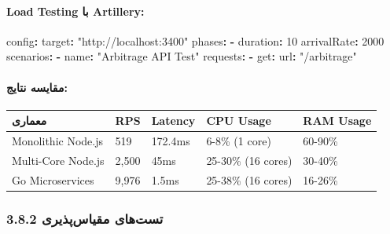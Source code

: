 \documentclass[
]{article}
\newenvironment{Shaded}{}{}
\newcommand{\AttributeTok}[1]{\textcolor[rgb]{0.49,0.56,0.16}{#1}}
\newcommand{\DecValTok}[1]{\textcolor[rgb]{0.25,0.63,0.44}{#1}}
\newcommand{\FunctionTok}[1]{\textcolor[rgb]{0.02,0.16,0.49}{#1}}
\newcommand{\KeywordTok}[1]{\textcolor[rgb]{0.00,0.44,0.13}{\textbf{#1}}}
\newcommand{\StringTok}[1]{\textcolor[rgb]{0.25,0.44,0.63}{#1}}
\newcounter{none} %
\begin{document}
\paragraph{Load Testing با
Artillery:}\label{load-testing-ux628ux627-artillery}

\begin{Shaded}
\begin{Highlighting}[]
\FunctionTok{config}\KeywordTok{:}
\AttributeTok{  }\FunctionTok{target}\KeywordTok{:}\AttributeTok{ }\StringTok{"http://localhost:3400"}
\AttributeTok{  }\FunctionTok{phases}\KeywordTok{:}
\AttributeTok{    }\KeywordTok{{-}}\AttributeTok{ }\FunctionTok{duration}\KeywordTok{:}\AttributeTok{ }\DecValTok{10}
\AttributeTok{      }\FunctionTok{arrivalRate}\KeywordTok{:}\AttributeTok{ }\DecValTok{2000}
\FunctionTok{scenarios}\KeywordTok{:}
\AttributeTok{  }\KeywordTok{{-}}\AttributeTok{ }\FunctionTok{name}\KeywordTok{:}\AttributeTok{ }\StringTok{"Arbitrage API Test"}
\AttributeTok{    }\FunctionTok{requests}\KeywordTok{:}
\AttributeTok{      }\KeywordTok{{-}}\AttributeTok{ }\FunctionTok{get}\KeywordTok{:}
\AttributeTok{          }\FunctionTok{url}\KeywordTok{:}\AttributeTok{ }\StringTok{"/arbitrage"}
\end{Highlighting}
\end{Shaded}

\paragraph{مقایسه
نتایج:}\label{ux645ux642ux627ux6ccux633ux647-ux646ux62aux627ux6ccux62c}

{\def\LTcaptype{none} %
\begin{longtable}[]{@{}lllll@{}}
\toprule\noalign{}
معماری & RPS & Latency & CPU Usage & RAM Usage \\
\midrule\noalign{}
\endhead
\bottomrule\noalign{}
\endlastfoot
Monolithic Node.js & 519 & 172.4ms & 6-8\% (1 core) & 60-90\% \\
Multi-Core Node.js & 2,500 & 45ms & 25-30\% (16 cores) & 30-40\% \\
Go Microservices & 9,976 & 1.5ms & 25-38\% (16 cores) & 16-26\% \\
\end{longtable}
}

\subsubsection{3.8.2 تست‌های
مقیاس‌پذیری}\label{ux62aux633ux62aux647ux627ux6cc-ux645ux642ux6ccux627ux633ux67eux630ux6ccux631ux6cc}
\end{document}
